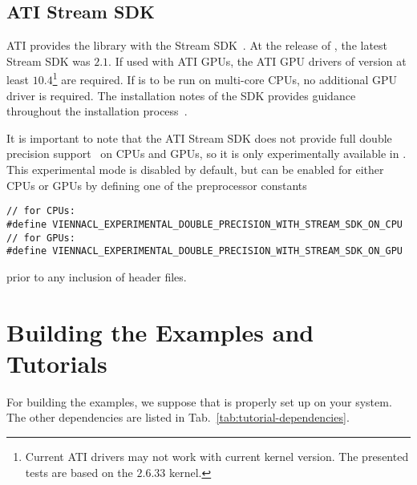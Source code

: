 \subsection{ATI Stream SDK} \label{sec:opencl-on-ati}
ATI provides the {\OpenCL} library with the Stream
SDK~\cite{atistream}. At the release of {\ViennaCLversion}, the latest Stream
SDK was $2.1$. If used with ATI GPUs, the ATI GPU drivers of version at least
$10.4$\footnote{Current ATI drivers
may not work with current kernel version. The presented tests are based on the 
$2.6.33$ kernel.} are required. If {\ViennaCL} is to be run on multi-core CPUs,
no additional GPU driver is required. The installation notes
of the SDK provides guidance throughout the
installation process~\cite{atistreamdocu}. 


It is important to note that the ATI Stream SDK does not provide full 
double precision support~\cite{atidouble} on CPUs and GPUs, so it is only experimentally
available in {\ViennaCL}. This experimental mode is disabled by default, but can
be enabled for either CPUs or GPUs by defining one of the preprocessor constants
\begin{lstlisting}
// for CPUs:
#define VIENNACL_EXPERIMENTAL_DOUBLE_PRECISION_WITH_STREAM_SDK_ON_CPU
// for GPUs:
#define VIENNACL_EXPERIMENTAL_DOUBLE_PRECISION_WITH_STREAM_SDK_ON_GPU
\end{lstlisting}
prior to any inclusion of {\ViennaCL} header files.


\section{Building the Examples and Tutorials}
For building the examples, we suppose that {\CMake} is properly set up
on your system. The other dependencies are listed in Tab.~\ref{tab:tutorial-dependencies}.

